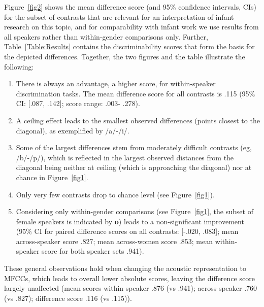 \documentclass[10pt,letterpaper]{article}
\begin{document}
Figure~\ref{fig2} shows the mean difference score (and 95\% confidence intervals, CIs) for the subset of contrasts that are relevant for an interpretation of infant research on this topic, and for comparability with infant work we use results from all speakers rather than within-gender comparisons only. Further, Table~\ref{Table:Results} contains the discriminability scores that form the basis for the depicted differences. Together, the two figures and the table illustrate the following:
\begin{enumerate}
\itemsep-0.15cm 
    \item There is always an advantage, a higher score, for within-speaker discrimination tasks. The mean difference score for all contrasts is .115 (95\% CI: [.087, .142]; score range: .003- .278).
    \item A ceiling effect leads to the smallest observed differences (points closest to the diagonal), as exemplified by /a/-/i/.
    \item Some of the largest differences stem from moderately difficult contrasts (eg, /b/-/p/), which is reflected in the largest observed distances from the diagonal being neither at ceiling (which is approaching the diagonal) nor at chance in Figure~\ref{fig1}.
    \item Only very few contrasts drop to chance level (see Figure~\ref{fig1}).
    \item Considering only within-gender comparisons (see Figure~\ref{fig1}, the subset of female speakers is indicated by \textbf{o}) leads to a non-significant improvement (95\% CI for paired difference scores on all contrasts: [-.020, .083]; mean across-speaker score .827; mean across-women score .853; mean within-speaker score for both speaker sets .941).
\end{enumerate}
These general observations hold when changing the acoustic representation to MFCCs, which leads to overall lower absolute scores, leaving the difference score largely unaffected (mean scores within-speaker .876 (vs .941); across-speaker .760 (vs .827); difference score .116 (vs .115)).
\end{document}
